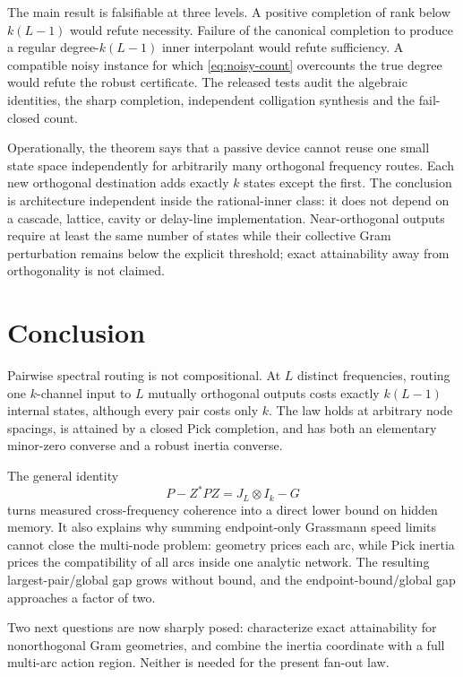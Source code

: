 \documentclass[11pt]{article}
\theoremstyle{definition}
\theoremstyle{remark}
\begin{document}
The main result is falsifiable at three levels.  A positive completion of
rank below $k(L-1)$ would refute necessity.  Failure of the canonical
completion to produce a regular degree-$k(L-1)$ inner interpolant would refute
sufficiency.  A compatible noisy instance for which
\eqref{eq:noisy-count} overcounts the true degree would refute the robust
certificate.  The released tests audit the algebraic identities, the sharp
completion, independent colligation synthesis and the fail-closed count.

Operationally, the theorem says that a passive device cannot reuse one small
state space independently for arbitrarily many orthogonal frequency routes.
Each new orthogonal destination adds exactly $k$ states except the first.
The conclusion is architecture independent inside the rational-inner class:
it does not depend on a cascade, lattice, cavity or delay-line
implementation.  Near-orthogonal outputs require at least the same number of
states while their collective Gram perturbation remains below the explicit
threshold; exact attainability away from orthogonality is not claimed.

\section{Conclusion}

Pairwise spectral routing is not compositional.  At $L$ distinct frequencies,
routing one $k$-channel input to $L$ mutually orthogonal outputs costs exactly
$k(L-1)$ internal states, although every pair costs only $k$.  The law holds
at arbitrary node spacings, is attained by a closed Pick completion, and has
both an elementary minor-zero converse and a robust inertia converse.

The general identity
\[
              P-Z^*PZ=J_L\otimes I_k-G
\]
turns measured cross-frequency coherence into a direct lower bound on hidden
memory.  It also explains why summing endpoint-only Grassmann speed limits
cannot close the multi-node problem: geometry prices each arc, while Pick inertia prices the
compatibility of all arcs inside one analytic network.  The resulting
largest-pair/global gap grows without bound, and the endpoint-bound/global gap
approaches a factor of two.

Two next questions are now sharply posed: characterize exact attainability
for nonorthogonal Gram geometries, and combine the inertia coordinate with a
full multi-arc action region.  Neither is needed for the present fan-out law.
\end{document}
